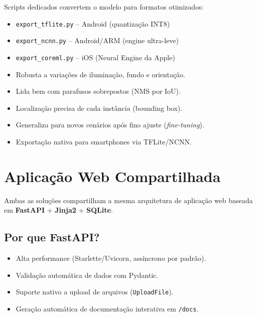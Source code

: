 \documentclass[12pt,a4paper]{article}
\begin{document}
Scripts dedicados convertem o modelo para formatos otimizados:

\begin{itemize}[leftmargin=*]
  \item \texttt{export\_tflite.py} -- Android (quantiza\c{c}\~ao INT8)
  \item \texttt{export\_ncnn.py}  -- Android/ARM (engine ultra-leve)
  \item \texttt{export\_coreml.py} -- iOS (Neural Engine da Apple)
\end{itemize}

\begin{tcolorbox}[vantagem={Vantagens da Solu\c{c}\~ao 2}]
\begin{itemize}[leftmargin=*, noitemsep]
  \item Robusta a varia\c{c}\~oes de ilumina\c{c}\~ao, fundo e orienta\c{c}\~ao.
  \item Lida bem com parafusos sobrepostos (NMS por IoU).
  \item Localiza\c{c}\~ao precisa de cada inst\^ancia (bounding box).
  \item Generaliza para novos cen\'arios ap\'os fino ajuste (\emph{fine-tuning}).
  \item Exporta\c{c}\~ao nativa para smartphones via TFLite/NCNN.
\end{itemize}
\end{tcolorbox}

\section{Aplica\c{c}\~ao Web Compartilhada}
\label{sec:web}

Ambas as solu\c{c}\~oes compartilham a mesma arquitetura de aplica\c{c}\~ao web
baseada em \textbf{FastAPI} + \textbf{Jinja2} + \textbf{SQLite}.

\subsection{Por que FastAPI?}

\begin{itemize}[leftmargin=*]
  \item Alta performance (Starlette/Uvicorn, ass\'incrono por padr\~ao).
  \item Valida\c{c}\~ao autom\'atica de dados com Pydantic.
  \item Suporte nativo a upload de arquivos (\texttt{UploadFile}).
  \item Gera\c{c}\~ao autom\'atica de documenta\c{c}\~ao interativa em \texttt{/docs}.
\end{itemize}
\end{document}
